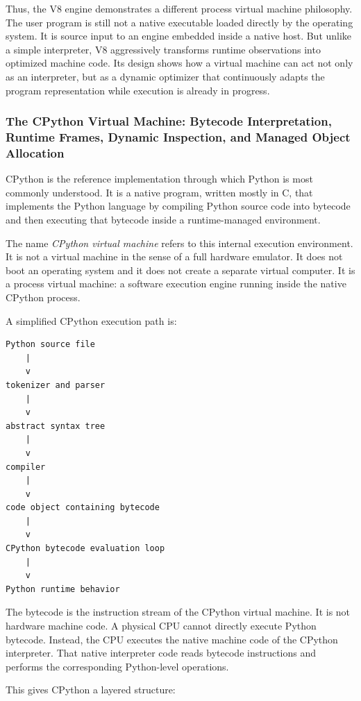 Thus, the V8 engine demonstrates a different process virtual machine philosophy. The user program is still not a native executable loaded directly by the operating system. It is source input to an engine embedded inside a native host. But unlike a simple interpreter, V8 aggressively transforms runtime observations into optimized machine code. Its design shows how a virtual machine can act not only as an interpreter, but as a dynamic optimizer that continuously adapts the program representation while execution is already in progress.



\subsubsection{The CPython Virtual Machine: Bytecode Interpretation, Runtime Frames, Dynamic Inspection, and Managed Object Allocation}

CPython is the reference implementation through which Python is most commonly understood. It is a native program, written mostly in C, that implements the Python language by compiling Python source code into bytecode and then executing that bytecode inside a runtime-managed environment.

The name \emph{CPython virtual machine} refers to this internal execution environment. It is not a virtual machine in the sense of a full hardware emulator. It does not boot an operating system and it does not create a separate virtual computer. It is a process virtual machine: a software execution engine running inside the native CPython process.

A simplified CPython execution path is:

\begin{verbatim}
Python source file
    |
    v
tokenizer and parser
    |
    v
abstract syntax tree
    |
    v
compiler
    |
    v
code object containing bytecode
    |
    v
CPython bytecode evaluation loop
    |
    v
Python runtime behavior
\end{verbatim}

The bytecode is the instruction stream of the CPython virtual machine. It is not hardware machine code. A physical CPU cannot directly execute Python bytecode. Instead, the CPU executes the native machine code of the CPython interpreter. That native interpreter code reads bytecode instructions and performs the corresponding Python-level operations.

This gives CPython a layered structure:

